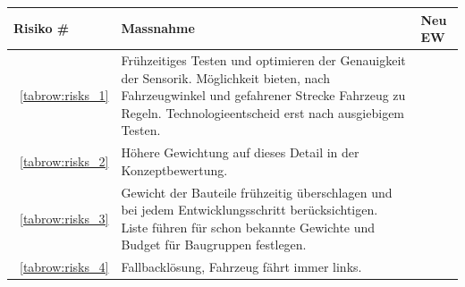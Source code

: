 \documentclass[main.tex]{subfiles} %
\begin{document}
\begin{table}[H]
    \begin{tabularx}{\textwidth}{|>{\centering\arraybackslash}p{2cm}|>{\raggedright\arraybackslash}X|>{\centering\arraybackslash}p{0.75cm}|}
        \hline
        \textbf{Risiko \#}    & \textbf{Massnahme}
                              & \textbf{Neu EW}                                                                                                                                                                                        \\

        \hline
        \rowcolor{yellow!30}
        ~\ref{tabrow:risks_1} & Frühzeitiges Testen und optimieren der Genauigkeit der Sensorik. Möglichkeit bieten, nach Fahrzeugwinkel und gefahrener Strecke Fahrzeug zu Regeln. Technologieentscheid erst nach ausgiebigem Testen.
                              & 2                                                                                                                                                                                                      \\

        \hline
        \rowcolor{yellow!30}
        ~\ref{tabrow:risks_2} & Höhere Gewichtung auf dieses Detail in der Konzeptbewertung.
                              & 3                                                                                                                                                                                                      \\

        \hline
        \rowcolor{green!30}
        ~\ref{tabrow:risks_3} & Gewicht der Bauteile frühzeitig überschlagen und bei jedem Entwicklungsschritt berücksichtigen. Liste führen für schon bekannte Gewichte und Budget für Baugruppen festlegen.
                              & 1                                                                                                                                                                                                      \\

        \hline
        \rowcolor{yellow!30}
        ~\ref{tabrow:risks_4} & Fallbacklösung, Fahrzeug fährt immer links.
                              & 3                                                                                                                                                                                                      \\


\end{tabularx}
\end{table}
\end{document}
